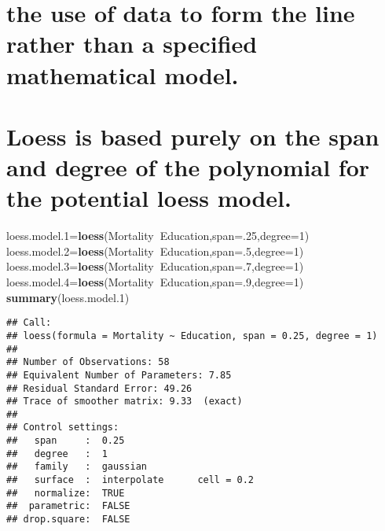 \documentclass[]{article}
\newenvironment{Shaded}{\begin{snugshade}}{\end{snugshade}}
\newcommand{\KeywordTok}[1]{\textcolor[rgb]{0.13,0.29,0.53}{\textbf{#1}}}
\newcommand{\DataTypeTok}[1]{\textcolor[rgb]{0.13,0.29,0.53}{#1}}
\newcommand{\DecValTok}[1]{\textcolor[rgb]{0.00,0.00,0.81}{#1}}
\newcommand{\OperatorTok}[1]{\textcolor[rgb]{0.81,0.36,0.00}{\textbf{#1}}}
\newcommand{\NormalTok}[1]{#1}
\begin{document}
\section{the use of data to form the line rather than a specified
mathematical
model.}\label{the-use-of-data-to-form-the-line-rather-than-a-specified-mathematical-model.}

\section{Loess is based purely on the span and degree of the polynomial
for the potential loess
model.}\label{loess-is-based-purely-on-the-span-and-degree-of-the-polynomial-for-the-potential-loess-model.}

\begin{Shaded}
\begin{Highlighting}[]
\NormalTok{loess.model.}\DecValTok{1}\NormalTok{=}\KeywordTok{loess}\NormalTok{(Mortality}\OperatorTok{~}\NormalTok{Education,}\DataTypeTok{span=}\NormalTok{.}\DecValTok{25}\NormalTok{,}\DataTypeTok{degree=}\DecValTok{1}\NormalTok{)}
\NormalTok{loess.model.}\DecValTok{2}\NormalTok{=}\KeywordTok{loess}\NormalTok{(Mortality}\OperatorTok{~}\NormalTok{Education,}\DataTypeTok{span=}\NormalTok{.}\DecValTok{5}\NormalTok{,}\DataTypeTok{degree=}\DecValTok{1}\NormalTok{)}
\NormalTok{loess.model.}\DecValTok{3}\NormalTok{=}\KeywordTok{loess}\NormalTok{(Mortality}\OperatorTok{~}\NormalTok{Education,}\DataTypeTok{span=}\NormalTok{.}\DecValTok{7}\NormalTok{,}\DataTypeTok{degree=}\DecValTok{1}\NormalTok{)}
\NormalTok{loess.model.}\DecValTok{4}\NormalTok{=}\KeywordTok{loess}\NormalTok{(Mortality}\OperatorTok{~}\NormalTok{Education,}\DataTypeTok{span=}\NormalTok{.}\DecValTok{9}\NormalTok{,}\DataTypeTok{degree=}\DecValTok{1}\NormalTok{)}
\KeywordTok{summary}\NormalTok{(loess.model.}\DecValTok{1}\NormalTok{)}
\end{Highlighting}
\end{Shaded}

\begin{verbatim}
## Call:
## loess(formula = Mortality ~ Education, span = 0.25, degree = 1)
## 
## Number of Observations: 58 
## Equivalent Number of Parameters: 7.85 
## Residual Standard Error: 49.26 
## Trace of smoother matrix: 9.33  (exact)
## 
## Control settings:
##   span     :  0.25 
##   degree   :  1 
##   family   :  gaussian
##   surface  :  interpolate      cell = 0.2
##   normalize:  TRUE
##  parametric:  FALSE
## drop.square:  FALSE
\end{verbatim}
\end{document}
